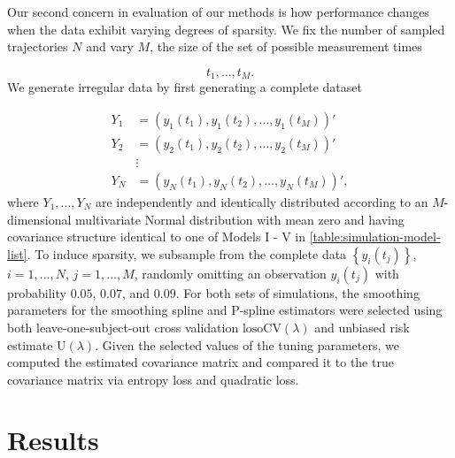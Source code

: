 \bigskip

Our second concern in evaluation of our methods is how performance changes when the data exhibit varying degrees of sparsity. We fix the number of sampled trajectories $N$ and vary $M$, the size of the set  of possible measurement times

\[
t_1,\dots, t_M.
\]
\noindent
We generate irregular data by first generating a complete dataset 

\begin{align*}
Y_1 &= \left(y_1\left(t_1\right), y_1\left(t_2\right), \dots, y_1\left(t_M\right)\right)' \\
Y_2 &= \left(y_2\left(t_1\right), y_2\left(t_2\right), \dots, y_2\left(t_M\right)\right)' \\
&\vdots \\
Y_N &= \left(y_N\left(t_1\right), y_N\left(t_2\right), \dots, y_N\left(t_M\right)\right)',
\end{align*}
\noindent
where $Y_1,\dots, Y_N$ are independently and identically distributed according to an $M$-dimensional multivariate Normal distribution with mean zero and having covariance structure identical to one of Models I - V in \ref{table:simulation-model-list}. To induce sparsity, we subsample from the complete data $\left\{y_i\left(t_j\right) \right\}$, $i = 1,\dots, N$, $j = 1,\dots, M$, randomly omitting an observation $y_i\left(t_j\right)$ with probability $0.05$, $0.07$, and $0.09$. For both sets of simulations, the smoothing parameters for the smoothing spline and P-spline estimators were selected using both leave-one-subject-out cross validation $\mbox{losoCV}\left(\lambda\right)$ and unbiased risk estimate $\mbox{U}\left(\lambda\right)$. Given the selected values of the tuning parameters, we computed the estimated covariance matrix and compared it to the true covariance matrix via entropy loss and quadratic loss. 




\section{Results}

